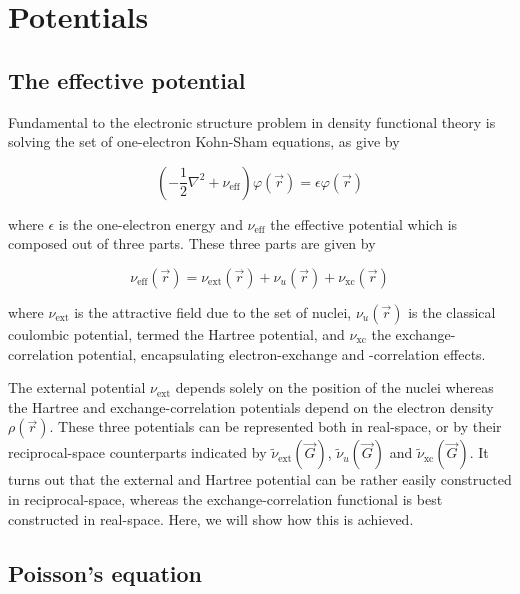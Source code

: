 %
%
%
\section{Potentials}

\subsection{The effective potential}

Fundamental to the electronic structure problem in density functional theory is solving the set of one-electron Kohn-Sham equations, as give by

\begin{equation}
    \left(-\frac{1}{2}\nabla^{2} + \nu_{\text{eff}}\right)\varphi(\vec{r}) = \epsilon \varphi(\vec{r})
\end{equation}

where $\epsilon$ is the one-electron energy and $\nu_{\text{eff}}$ the effective potential which is composed out of three parts. These three parts are given by

\begin{equation}
    \nu_{\text{eff}}(\vec{r}) = \nu_{\text{ext}}(\vec{r}) + \nu_{u}(\vec{r}) + \nu_{\text{xc}}(\vec{r})
\end{equation}

where $\nu_{\text{ext}}$ is the attractive field due to the set of nuclei, $\nu_{u}(\vec{r})$ is the classical coulombic potential, termed the Hartree potential, and $\nu_{\text{xc}}$ the exchange-correlation potential, encapsulating electron-exchange and -correlation effects.

The external potential $\nu_{\text{ext}}$ depends solely on the position of the nuclei whereas the Hartree and exchange-correlation potentials depend on the electron density $\rho(\vec{r})$. These three potentials can be represented both in real-space, or by their reciprocal-space counterparts indicated by $\tilde{\nu}_{\text{ext}}(\vec{G})$, $\tilde{\nu}_{u}(\vec{G})$ and $\tilde{\nu}_{\text{xc}}(\vec{G})$. It turns out that the external and Hartree potential can be rather easily constructed in reciprocal-space, whereas the exchange-correlation functional is best constructed in real-space. Here, we will show how this is achieved.

%
%
%
\subsection{Poisson's equation}

